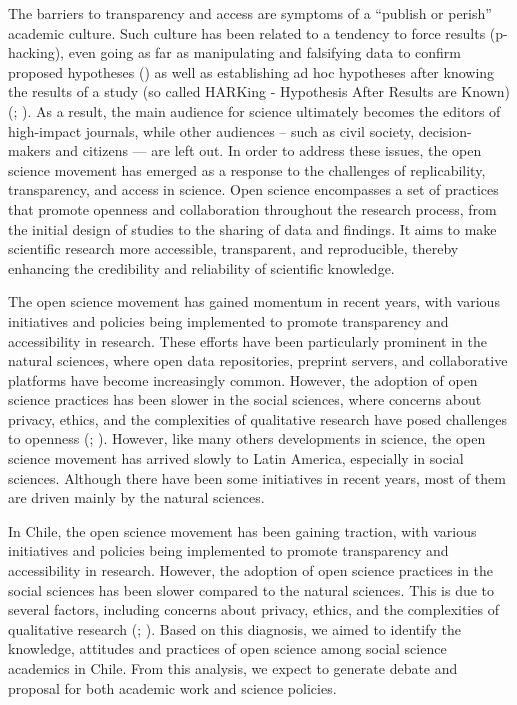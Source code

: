 \documentclass[
  english,
  letterpaper,
]{article}
\begin{document}
The barriers to transparency and access are symptoms of a ``publish or
perish'' academic culture. Such culture has been related to a tendency
to force results (p-hacking), even going as far as manipulating and
falsifying data to confirm proposed hypotheses
() as well as
establishing ad hoc hypotheses after knowing the results of a study (so
called HARKing - Hypothesis After Results are Known)
(;
). As a result, the main
audience for science ultimately becomes the editors of high-impact
journals, while other audiences -- such as civil society,
decision-makers and citizens --- are left out. In order to address these
issues, the open science movement has emerged as a response to the
challenges of replicability, transparency, and access in science. Open
science encompasses a set of practices that promote openness and
collaboration throughout the research process, from the initial design
of studies to the sharing of data and findings. It aims to make
scientific research more accessible, transparent, and reproducible,
thereby enhancing the credibility and reliability of scientific
knowledge.

The open science movement has gained momentum in recent years, with
various initiatives and policies being implemented to promote
transparency and accessibility in research. These efforts have been
particularly prominent in the natural sciences, where open data
repositories, preprint servers, and collaborative platforms have become
increasingly common. However, the adoption of open science practices has
been slower in the social sciences, where concerns about privacy,
ethics, and the complexities of qualitative research have posed
challenges to openness
(;
). However,
like many others developments in science, the open science movement has
arrived slowly to Latin America, especially in social sciences. Although
there have been some initiatives in recent years, most of them are
driven mainly by the natural sciences.

In Chile, the open science movement has been gaining traction, with
various initiatives and policies being implemented to promote
transparency and accessibility in research. However, the adoption of
open science practices in the social sciences has been slower compared
to the natural sciences. This is due to several factors, including
concerns about privacy, ethics, and the complexities of qualitative
research
(;
). Based on
this diagnosis, we aimed to identify the knowledge, attitudes and
practices of open science among social science academics in Chile. From
this analysis, we expect to generate debate and proposal for both
academic work and science policies.
\end{document}
